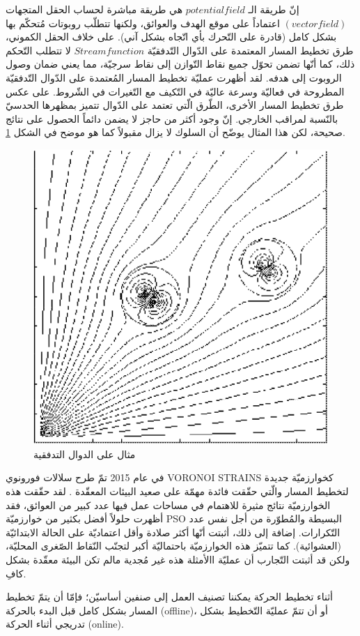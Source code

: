  إنّ طريقة الـ $ potential field $ هي طريقة مباشرة لحساب الحقل المتجهات $ (vector field) $ اعتماداً على موقع الهدف والعوائق، ولكنها تتطلّب روبوتات مُتحكّم بها بشكل كامل (قادرة على التّحرك بأي اتّجاه بشكل آني). على خلاف الحقل الكموني، طرق تخطيط المسار المعتمدة على الدّوال التّدفقيّة $ Stream function $ لا تتطلب التّحكم ذلك، كما أنّها تضمن تحوّل جميع نقاط التّوازن إلى نقاط سرجيّة، مما يعني ضمان وصول الروبوت إلى هدفه. لقد أظهرت عمليّة تخطيط المسار المُعتمدة على الدّوال التّدفقيّة المطروحة في \cite{b10} فعاليّة وسرعة عاليّة في التّكيف مع التّغيرات في الشّروط. على عكس طرق تخطيط المسار الأخرى، الطّرق الّتي تعتمد على الدّوال تتميز بمظهرها الحدسيّ بالنّسبة لمراقب الخارجي. إنّ وجود أكثر من حاجز لا يضمن دائماً الحصول على نتائج صحيحة، لكن هذا المثال يوضّح أن السلوك لا يزال مقبولاً كما هو موضح في الشكل \ref{06:fig:1}.
 \begin{figure}[h]
 	\centering
 	\includegraphics[width=0.5\linewidth]{figs/06/fig1}
 	\caption{مثال على الدوال التدفقية}
 	\label{06:fig:1}
 \end{figure}


في عام 2015 تمّ طرح سلالات فورونوي \textenglish{VORONOI STRAINS} كخوارزميّة جديدة لتخطيط المسار والّتي حقّقت فائدة مهمّة على صعيد البيئات المعقّدة \cite{b9}. لقد حقّقت هذه الخوارزميّة نتائج مثيرة للاهتمام في مساحات عمل فيها عدد كبير من العوائق، فقد أظهرت حلولاً أفضل بكثير من خوارزميّة PSO البسيطة والمُطوّرة من أجل نفس عدد التّكرارات. إضافة إلى ذلك، أثبتت أنّها أكثر صلادة وأقل اعتماديّة على الحالة الابتدائيّة (العشوائية). كما تتميّز هذه الخوارزميّة باحتماليّة أكبر لتجنّب النّقاط الصّغرى المحليّة، ولكن قد أثبتت التّجارب أن عمليّة االأمثلة هذه غير مُجدية مالم تكن البيئة معقّدة بشكل كافِ.

أثناء تخطيط الحركة يمكننا تصنيف العمل إلى صنفين أساسيّن؛ فإمّا أن يتمّ تخطيط المسار بشكل كامل قبل البدء بالحركة (offline)، أو أن تتمّ عمليّة التّخطيط بشكل تدريجي أثناء الحركة (online).


